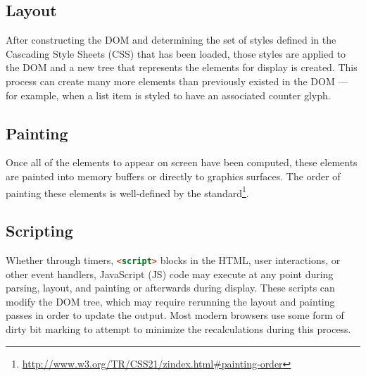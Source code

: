 \subsection{Layout}

After constructing the DOM and determining the set of styles defined in the Cascading Style Sheets (CSS) that has
been loaded, those styles are applied to the DOM and a new tree that represents the elements for display is
created.
This process can create many more elements than previously existed in the DOM --- for example, when a list item is
styled to have an associated counter glyph.

\subsection{Painting}

Once all of the elements to appear on screen have been computed, these elements are painted into memory buffers or
directly to graphics surfaces.
The order of painting these elements is well-defined by the standard\footnote{\url{http://www.w3.org/TR/CSS21/zindex.html#painting-order}}.

\subsection{Scripting}

Whether through timers, \lstinline[language=HTML]{<script>} blocks in the HTML, user interactions, or other event handlers,
JavaScript (JS) code may execute at any point during parsing, layout, and painting or afterwards during display.
These scripts can modify the DOM tree, which may require rerunning the layout and painting passes in order to update
the output.
Most modern browsers use some form of dirty bit marking to attempt to minimize the recalculations during this process.


